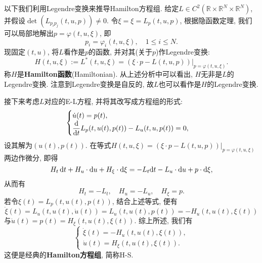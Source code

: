 以下我们利用Legendre变换来推导Hamilton方程组. 给定$L \in C^2(\mathbb{R} \times \mathbb{R}^N \times \mathbb{R}^N)$, 并假设$\det(L_{p_ip_j}(t, u, p)) \neq 0$.
令$\xi = \xi = L_p(t, u, p)$, 根据隐函数定理, 我们可以局部地解出$p = \varphi(t, u, \xi)$, 即 
\begin{equation*}
    p_i = \varphi_i(t, u, \xi), \quad 1 \leq i \leq N.
\end{equation*} 
现固定$(t, u)$, 将$L$看作是$p$的函数, 并对其(关于$p$)作Legendre变换:
\begin{equation*}
    \boxed{H(t, u, \xi):= L^*(t, u, \xi) = (\xi \cdot p - L(t, u, p))|_{p = \varphi(t, u, \xi)}.}
\end{equation*}
称$H$是\textbf{Hamilton函数}(Hamiltonian). 从上述分析中可以看出, $H$无非是$L$的Legendre变换.
注意到Legendre变换是自反的, 故$L$也可以看作是$H$的Legendre变换.

接下来考虑$L$对应的E-L方程, 并将其改写成方程组的形式:
\begin{equation*}
    \begin{cases} 
        \dot u(t) = p(t), \\  
        \displaystyle\frac{{\rm d}}{{\rm d}t}L_p(t, u(t), p(t)) - L_u(t, u, p(t)) = 0,
    \end{cases}
\end{equation*}
设其解为$(u(t), p(t))$. 在等式$H(t, u, \xi)= \left.(\xi \cdot p - L(t, u, p))\right|_{p = \varphi(t, u, \xi)}$两边作微分, 即得 
\begin{equation*}
    H_t \,{\rm d}t + H_u \cdot {\rm d}u + H_{\xi} \cdot {\rm d}\xi = -L_t {\rm d}t - L_u \cdot {\rm d}u + p \cdot {\rm d}\xi,
\end{equation*}
从而有 
\begin{equation*}
    H_t = -L_t, \quad H_u = -L_u, \quad H_{\xi} = p.
\end{equation*}
若令$\xi(t) = L_p(t, u(t), p(t))$, 结合上述等式, 便有 
\begin{equation*}
    \dot\xi(t) = L_u(t, u(t), \dot u(t)) = L_u(t, u(t), p(t)) = -H_u(t, u(t), \xi(t)) 
\end{equation*}
与$\dot u(t) = p(t) = H_{\xi}(t, u(t), \xi(t))$. 综上所述, 我们有
\begin{equation*}
    \boxed{\begin{cases} 
        \dot\xi(t) = -H_u(t, u(t), \xi(t)), \\ 
        \dot u(t) = H_{\xi}(t, u(t), \xi(t)). 
    \end{cases}}
\end{equation*}
这便是经典的\textbf{Hamilton方程组}, 简称H-S.

